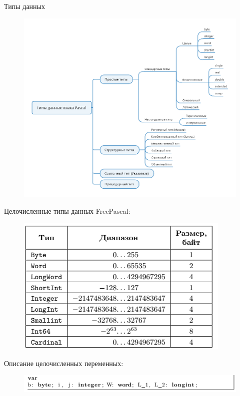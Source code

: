 \documentclass{beamer}
\begin{document}
\begin{frame}{Типы данных}
\begin{figure}[h]
\centering
\includegraphics{images/tree_of_types.png}
\end{figure}
\end{frame} 

\begin{frame}
Целочисленные типы данных FreePascal:
\begin{figure}[h]
\centering
\includegraphics[scale=0.6]{images/lec02-pic06.png}
\end{figure}
Описание целочисленных переменных:
\begin{figure}[h]
\centering
\includegraphics[scale=0.7]{images/lec02-pic07.png}
\end{figure}
\end{frame} 
\end{document}
